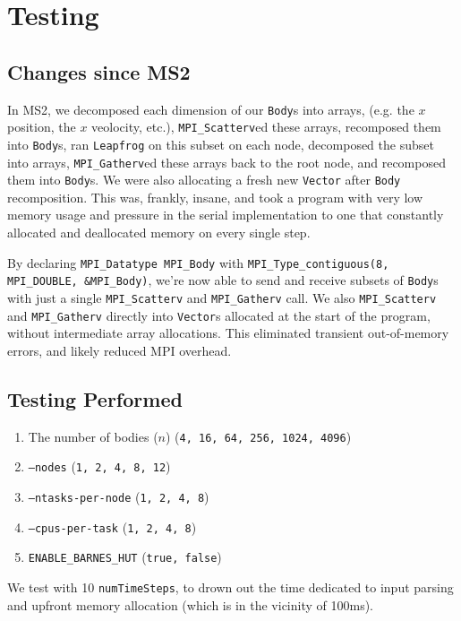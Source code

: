 \documentclass[11pt,a4paper]{article}
\begin{document}
\section*{Testing}

\subsection*{Changes since MS2}

In MS2, we decomposed each dimension of our \texttt{Body}s into arrays, (e.g. the $x$ position, the $x$ veolocity, etc.), \texttt{MPI\_Scatterv}ed these arrays, recomposed them into \texttt{Body}s, ran \texttt{Leapfrog} on this subset on each node, decomposed the subset into arrays, \texttt{MPI\_Gatherv}ed these arrays back to the root node, and recomposed them into \texttt{Body}s. We were also allocating a fresh new \texttt{Vector} after \texttt{Body} recomposition. This was, frankly, insane, and took a program with very low memory usage and pressure in the serial implementation to one that constantly allocated and deallocated memory on every single step.

By declaring \texttt{MPI\_Datatype MPI\_Body} with \texttt{MPI\_Type\_contiguous(8, MPI\_DOUBLE, \&MPI\_Body)}, we're now able to send and receive subsets of \texttt{Body}s with just a single \texttt{MPI\_Scatterv} and \texttt{MPI\_Gatherv} call. We also \texttt{MPI\_Scatterv} and \texttt{MPI\_Gatherv} directly into \texttt{Vector}s allocated at the start of the program, without intermediate array allocations. This eliminated transient out-of-memory errors, and likely reduced MPI overhead.


\subsection*{Testing Performed}

\begin{enumerate}
    \item The number of bodies ($n$) (\texttt{4, 16, 64, 256, 1024, 4096})
    \item \texttt{--nodes} (\texttt{1, 2, 4, 8, 12})
    \item \texttt{--ntasks-per-node} (\texttt{1, 2, 4, 8})
    \item \texttt{--cpus-per-task} (\texttt{1, 2, 4, 8})
    \item \texttt{ENABLE\_BARNES\_HUT} (\texttt{true, false})
\end{enumerate}

We test with 10 \texttt{numTimeSteps}, to drown out the time dedicated to input parsing and upfront memory allocation (which is in the vicinity of 100ms). 
\end{document}
